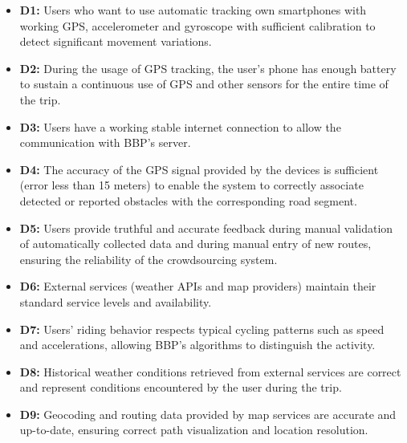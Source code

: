 \begin{itemize}
    \item[] \textbf{D1:} Users who want to use automatic tracking own smartphones with working GPS, accelerometer and gyroscope with sufficient calibration to detect significant movement variations.
    
    \item[] \textbf{D2:} During the usage of GPS tracking, the user's phone has enough battery to sustain a continuous use of GPS and other sensors for the entire time of the trip.
    
    \item[] \textbf{D3:} Users have a working stable internet connection to allow the communication with BBP's server.
    
    \item[] \textbf{D4:} The accuracy of the GPS signal provided by the devices is sufficient (error less than 15 meters) to enable the system to correctly associate detected or reported obstacles with the corresponding road segment.
    
    \item[] \textbf{D5:} Users provide truthful and accurate feedback during manual validation of automatically collected data and during manual entry of new routes, ensuring the reliability of the crowdsourcing system.
    
    \item[] \textbf{D6:} External services (weather APIs and map providers) maintain their standard service levels and availability.
    
    \item[] \textbf{D7:} Users' riding behavior respects typical cycling patterns such as speed and accelerations, allowing BBP's algorithms to distinguish the activity.
    
    \item[] \textbf{D8:} Historical weather conditions retrieved from external services are correct and represent conditions encountered by the user during the trip.

    \item[] \textbf{D9:} Geocoding and routing data provided by map services are accurate and up-to-date, ensuring correct path visualization and location resolution.
\end{itemize}